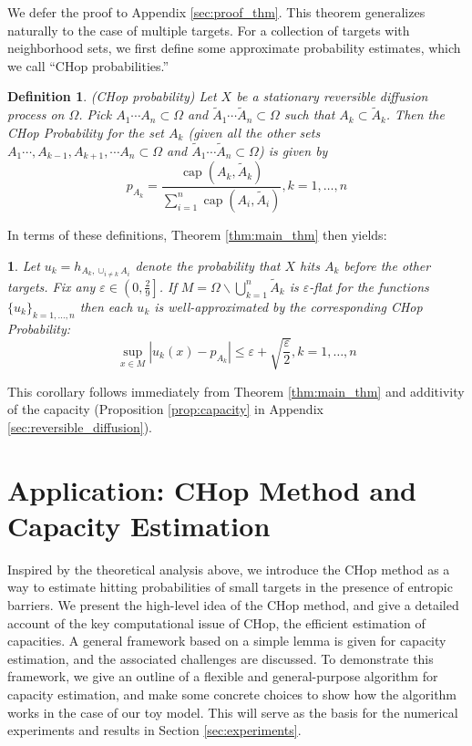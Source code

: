 \documentclass[english, aip, jcp, priprint, graphicx,floatfix]{revtex4-1}
\newtheorem{definition}{Definition}
\theoremstyle{plain}
\theoremstyle{definition}
\theoremstyle{plain}
\newtheorem{cor}[thm]{\protect\corollaryname}
\providecommand{\corollaryname}{Corollary}
\begin{document}
We defer the proof to Appendix \ref{sec:proof_thm}. This theorem generalizes naturally to the case of multiple targets.  For a collection of targets with neighborhood sets, we first define some approximate probability estimates, which we call ``CHop probabilities.''

\begin{definition}(CHop probability)
Let $X$ be a stationary reversible diffusion process on $\Omega$.  Pick $A_1\cdots A_n \subset \Omega$ and $\tilde A_1\cdots \tilde A_n \subset \Omega$ such that $A_k \subset \tilde A_k$.  Then the CHop Probability for the set $A_k$ (given all the other sets $A_1\cdots, A_{k-1}, A_{k+1}, \cdots A_n \subset \Omega$ and $\tilde A_1\cdots \tilde A_n \subset \Omega$) is given by
\begin{equation*}
p_{A_k} = \frac{\ensuremath{\operatorname{cap}} (A_k, \tilde{A}_k)}{\sum_{i = 1}^n \ensuremath{\operatorname{cap}} (A_i, \tilde{A}_i)}, k=1,\dots, n
\end{equation*} 
\end{definition}

In terms of these definitions, Theorem \ref{thm:main_thm} then yields:

\begin{cor}\label{thm:main_cor} Let $u_k = h_{A_k,\cup_{i\neq k} A_i}$ denote the probability that $X$ hits $A_k$ before the other targets.  Fix any $\varepsilon \in \left( 0, \frac{2}{9} \right]$.  If $M = \Omega \backslash \bigcup_{k = 1}^n \tilde{A}_k $ is $\varepsilon$-flat for the functions $\{u_k\}_{k=1,\dots, n}$ then each $u_k$ is well-approximated by the corresponding CHop Probability:
\[ \sup_{x \in M} \left| u_k (x) - p_{A_k} \right| \leqslant \varepsilon + \sqrt{\frac{\varepsilon}{2}}, k=1,\dots, n\]
\end{cor}

This corollary follows immediately from Theorem \ref{thm:main_thm} and additivity of the capacity (Proposition \ref{prop:capacity} in Appendix \ref{sec:reversible_diffusion}). 

\section{Application: CHop Method and Capacity Estimation}\label{sec:algorithm}

Inspired by the theoretical analysis above, we introduce the CHop method as a way to estimate hitting probabilities of small targets in the presence of entropic barriers. We present the high-level idea of the CHop method, and give a detailed account of the key computational issue of CHop, the efficient estimation of capacities. A general framework based on a simple lemma is given for capacity estimation, and the associated challenges are discussed. To demonstrate this framework, we give an outline of a flexible and general-purpose algorithm for capacity estimation, and make some concrete choices to show how the algorithm works in the case of our toy model. This will serve as the basis for the numerical experiments and results in Section \ref{sec:experiments}.
\end{document}
